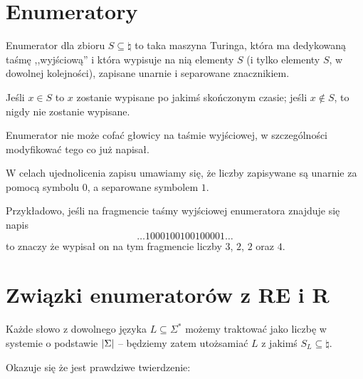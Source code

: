 \section{Enumeratory}

\begin{definition}
	Enumerator dla zbioru \(S \subseteq \natural \) to taka maszyna Turinga, która ma dedykowaną taśmę ,,wyjściową'' i która wypisuje na nią elementy \(S\) (i tylko elementy \(S\), w dowolnej kolejności), zapisane unarnie i separowane znacznikiem.

	Jeśli \( x \in S \) to \( x \) zostanie wypisane po jakimś skończonym czasie; jeśli \(x \not \in S\), to nigdy nie zostanie wypisane.

	Enumerator nie może cofać głowicy na taśmie wyjściowej, w szczególności modyfikować tego co już napisał.

	W celach ujednolicenia zapisu umawiamy się, że liczby zapisywane są unarnie za pomocą symbolu \(0\), a separowane symbolem \(1\).

	Przykładowo, jeśli na fragmencie taśmy wyjściowej enumeratora znajduje się napis
	\[
		\dots 1000100100100001 \dots
	\]
	to znaczy że wypisał on na tym fragmencie liczby \(3\), \(2\), \(2\) oraz \(4\).
\end{definition}

\section{Związki enumeratorów z RE i R}

Każde słowo z dowolnego języka \( L \subseteq \Sigma^* \) możemy traktować jako liczbę w systemie o podstawie \( \card{\Sigma} \) -- będziemy zatem utożsamiać \( L \) z jakimś \( S_L \subseteq \natural \).

Okazuje się że jest prawdziwe twierdzenie:

